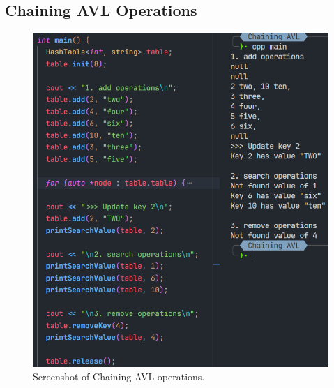 \pagebreak
\subsection{Chaining AVL Operations}
\begin{figure}[!ht]
	\centering
	\includegraphics[width=\textwidth]{imgs/Chaining AVL/operations.png}
	\caption{Screenshot of Chaining AVL operations.}\label{fig:chainingavl-operations}
\end{figure}